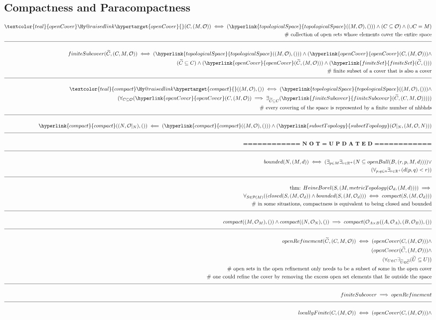 \documentclass[a4paper]{article}
\makeatletter
\newcommand{\melazy}{\textbf{============ N O T = U P D A T E D ============}}
\newcommand{\eqComment}[1]{\text{  \# #1}}
\newcommand{\thm}[1]{\text{thm: }#1}
\newcommand{\n}{\\[1.5ex] \hline \nonumber \\[0ex]}
\newcommand{\m}{\nonumber \\}
\newcommand{\labeltarget}[1]{\Hy@raisedlink{\hypertarget{#1}{}}}
\newcommand{\dfn}[1]{\textcolor{teal}{#1}\labeltarget{#1}}
\newcommand{\rfr}[1]{\hyperlink{#1}{#1}}
\makeatother
\begin{document}
\subsection{Compactness and Paracompactness}
\begin{tcolorbox}
\begin{align}
   \dfn{openCover}(C, (M, \mathcal{O})) \iff (\rfr{topologicalSpace}((M, \mathcal{O}), ())) \land (C \subseteq \mathcal{O}) \land (\cup C = M)
\m \eqComment{collection of open sets whose elements cover the entire space}
\n finiteSubcover(\widetilde{C}, (C, M, \mathcal{O})) \iff (\rfr{topologicalSpace}((M, \mathcal{O}), ())) \land (\rfr{openCover}(C, (M, \mathcal{O}))) \land
\m (\widetilde{C} \subseteq C) \land (\rfr{openCover}(\widetilde{C}, (M, \mathcal{O}))) \land (\rfr{finiteSet}(\widetilde{C}, ()))
\m \eqComment{finite subset of a cover that is also a cover}
\n \dfn{compact}((M, \mathcal{O}), ()) \iff (\rfr{topologicalSpace}((M, \mathcal{O}), ())) \land
\m (\forall_{C \subseteq \mathcal{O}} (\rfr{openCover}(C, (M, \mathcal{O})) \implies \exists_{\widetilde{C} \subseteq C} (\rfr{finiteSubcover}(\widetilde{C}, (C, M, \mathcal{O})))))
\m \eqComment{every covering of the space is represented by a finite number of nhbhds}
\n \rfr{compact}((N, \mathcal{O}|_N), ()) \impliedby (\rfr{compact}((M, \mathcal{O}), ())) \land (\rfr{subsetTopology}(\mathcal{O}|_N, (M, \mathcal{O}, N)))
\n \melazy
\n bounded(N, (M, d)) \iff (\exists_{p \in M} \exists_{r \in \mathbb{R}^+} (N \subseteq openBall(B, (r, p, M, d)))) \lor
\m (\forall_{p, q \in n} \exists_{r \in \mathbb{R}^+}(d(p, q) < r))
\n \thm{HeineBorel} (S, (M, metricTopology(\mathcal{O}_d, (M, d)))) \implies 
\m \forall_{S \in \mathcal{P}(M)} ((closed(S, (M, \mathcal{O}_d)) \land bounded(S, (M, \mathcal{O}_d))) \iff compact(S, (M, \mathcal{O}_d)))
\m \eqComment{in some situations, compactness is equivalent to being closed and bounded}
\n compact((M, \mathcal{O}_M), ()) \land compact((N, \mathcal{O}_N), ()) \implies compact(\mathcal{O}_{A \times B}((A, \mathcal{O}_A), (B, \mathcal{O}_B)), ())
\n openRefinement(\widetilde{C}, (C, M, \mathcal{O})) \iff (openCover(C, (M, \mathcal{O}))) \land
\m (openCover(\widetilde{C}, (M, \mathcal{O}))) \land
\m (\forall_{U \in C} \exists_{\widetilde{U} \in \widetilde{C}} (\widetilde{U} \subseteq U))
\m \eqComment{open sets in the open refinement only needs to be a subset of some in the open cover}
\m \eqComment{one could refine the cover by removing the excess open set elements that lie outside the space}
\n finiteSubcover \implies openRefinement
\n locallyFinite(C, (M, \mathcal{O})) \iff (openCover(C, (M, \mathcal{O}))) \land 

\end{align}
\end{tcolorbox}
\end{document}
